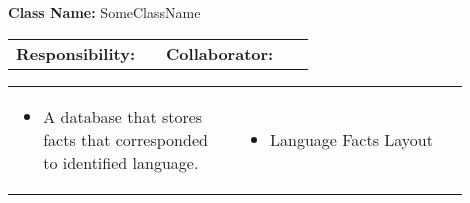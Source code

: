 \begin{cards}[]
    \textbf{Class Name:} SomeClassName
    \tcbline
    \begin{tabular}{p{0.45\linewidth} | p{0.45\linewidth}}
        \textbf{Responsibility:}& 
        \textbf{Collaborator:}\\
    \end{tabular}
    \tcbline
    \begin{tabular}{p{0.45\linewidth} | p{0.45\linewidth}}
        \begin{itemize}
            \item A database that stores facts that corresponded to identified language.
        \end{itemize}
        &
        \begin{itemize}
            \item Language Facts Layout
        \end{itemize}
    \end{tabular}
\end{cards}